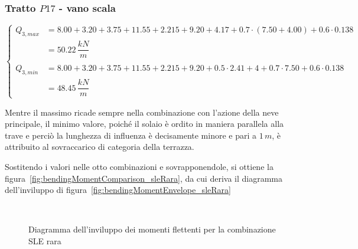 \subsubsection*{Tratto $P17$ - vano scala}
\begin{equation*}
	\begin{cases}
		Q_{3,max} &= 8.00+3.20+3.75 + 11.55+2.215+9.20 + 4.17 + 0.7\cdot(7.50+4.00) + 0.6\cdot0.138\\
		&= 50.22\,\dfrac{kN}{m}\\\\
		Q_{3,min} &= 8.00+3.20+3.75 + 11.55+2.215+9.20 + 0.5\cdot2.41 + 4+ 0.7\cdot7.50 + 0.6\cdot0.138\\
		&= 48.45\,\dfrac{kN}{m}
	\end{cases}
\end{equation*}

Mentre il massimo ricade sempre nella combinazione con l'azione della neve principale, il minimo valore, poiché il solaio è ordito in maniera parallela alla trave e perciò la lunghezza di influenza è decisamente minore e pari a $1\,m$, è attribuito al sovraccarico di categoria della terrazza.

Sostitendo i valori nelle otto combinazioni e sovrapponendole, si ottiene la figura~\ref{fig:bendingMomentComparison_sleRara}, da cui deriva il diagramma dell'inviluppo di figura~\ref{fig:bendingMomentEnvelope_sleRara}

\begin{figure}
	\centering
	
	\\
	\caption{Diagramma dell'inviluppo dei momenti flettenti per la combinazione SLE rara}
	\label{fig:bendingMoment_sleRara}
\end{figure}

